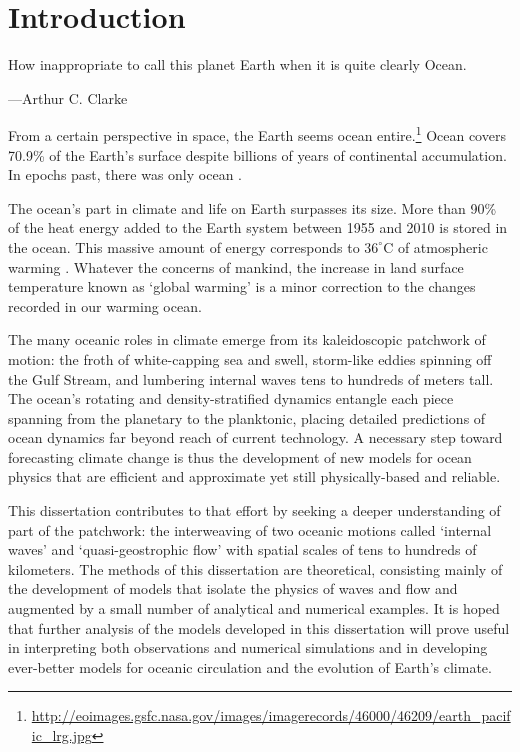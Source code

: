 \documentclass[12pt, oneside]{book}
\begin{document}
\chapter{Introduction}

\thispagestyle{preliminary}
\setcounter{page}{1}
\label{introChapter}

\noindent How inappropriate to call this planet Earth when it is quite clearly Ocean. \smallskip

\indent ---Arthur C. Clarke \bigskip \bigskip

From a certain perspective in space, the Earth seems ocean entire.\footnote{\url{http://eoimages.gsfc.nasa.gov/images/imagerecords/46000/46209/earth_pacific_lrg.jpg}}  Ocean covers 70.9\% of the Earth's surface despite billions of years of continental accumulation.  In epochs past, there was only ocean \citep{ward2000rare}.

The ocean's part in climate and life on Earth surpasses its size.  More than 90\% of the heat energy added to the Earth system between 1955 and 2010 is stored in the ocean.  This massive amount of energy corresponds to $36^{\circ}$C of atmospheric warming \citep{levitus2012world}.  Whatever the concerns of mankind, the increase in land surface temperature known as `global warming' is a minor correction to the changes recorded in our warming ocean.

The many oceanic roles in climate emerge from its kaleidoscopic patchwork of motion: the froth of white-capping sea and swell, storm-like eddies spinning off the Gulf Stream, and lumbering internal waves tens to hundreds of meters tall.  The ocean's rotating and density-stratified dynamics entangle each piece spanning from the planetary to the planktonic, placing detailed predictions of ocean dynamics far beyond reach of current technology.  A necessary step toward forecasting climate change is thus the development of new models for ocean physics that are efficient and approximate yet still physically-based and reliable. 

This dissertation contributes to that effort by seeking a deeper understanding of part of the patchwork: the interweaving of two oceanic motions called `internal waves' and `quasi-geostrophic flow' with spatial scales of tens to hundreds of kilometers.  The methods of this dissertation are theoretical, consisting mainly of the development of models that isolate the physics of waves and flow and augmented by a small number of analytical and numerical examples.  It is hoped that further analysis of the models developed in this dissertation will prove useful in interpreting both observations and numerical simulations and in developing ever-better models for oceanic circulation and the evolution of Earth's climate.
\end{document}
